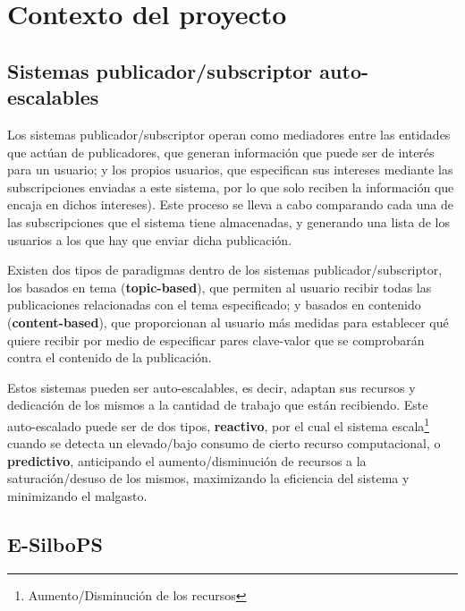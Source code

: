 
\section{Contexto del proyecto} \label{sct:intro_contexto}

\subsection{Sistemas publicador/subscriptor auto-escalables} \label{ssct:intro_contexto_sistpubsub}

Los sistemas publicador/subscriptor operan como mediadores entre las entidades 
que actúan de publicadores, que generan información que puede ser de 
interés para un usuario; y los propios usuarios, que especifican sus intereses
mediante las subscripciones enviadas a este sistema, por lo que solo 
reciben la información que encaja en dichos
intereses)\cite{paper:themanyfacesofpubsub}\cite{paper:e-streamhub}.
Este proceso se lleva a cabo comparando cada una de las subscripciones que el 
sistema tiene almacenadas, y generando una lista de los usuarios a los que hay
que enviar dicha publicación. 

Existen dos tipos de paradigmas dentro de los sistemas publicador/subscriptor, 
los basados en tema (\textbf{topic-based}), que permiten al usuario recibir 
todas las publicaciones relacionadas con el tema especificado; y basados en 
contenido (\textbf{content-based}), que proporcionan al usuario más medidas 
para establecer qué quiere recibir por medio de especificar pares clave-valor 
que se comprobarán contra el contenido de la publicación.

Estos sistemas pueden ser auto-escalables, es decir, adaptan sus recursos y 
dedicación de los mismos a la cantidad de trabajo que están recibiendo. 
Este auto-escalado puede ser de dos tipos, \textbf{reactivo}, por el cual el 
sistema escala\footnote{Aumento/Disminución de los recursos} cuando se detecta
un elevado/bajo consumo de cierto  recurso computacional, o \textbf{predictivo}, 
anticipando el aumento/disminución de recursos a la saturación/desuso de los 
mismos, maximizando la eficiencia del sistema y minimizando el malgasto.

\subsection{E-SilboPS} \label{ssct:intro_motivacion_esilbops}

